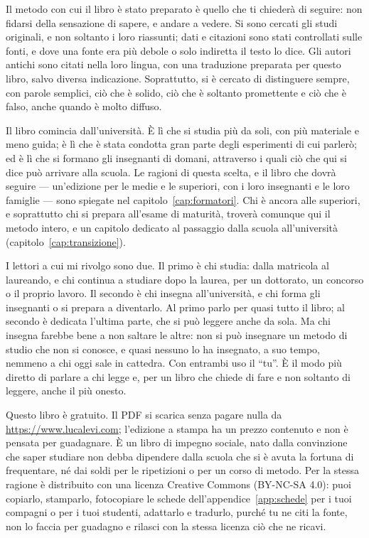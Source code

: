 Il metodo con cui il libro è stato preparato è quello che ti chiederà
di seguire: non fidarsi della sensazione di sapere, e andare a vedere.
Si sono cercati gli studi originali, e non soltanto i loro riassunti;
dati e citazioni sono stati controllati sulle fonti, e dove una fonte
era più debole o solo indiretta il testo lo dice. Gli autori antichi
sono citati nella loro lingua, con una traduzione preparata per questo
libro, salvo diversa indicazione. Soprattutto, si è cercato di
distinguere sempre, con parole semplici, ciò che è solido, ciò che è
soltanto promettente e ciò che è falso, anche quando è molto diffuso.

Il libro comincia dall'università. È lì che si studia più da soli, con
più materiale e meno guida; è lì che è stata condotta gran parte degli
esperimenti di cui parlerò; ed è lì che si formano gli insegnanti di
domani, attraverso i quali ciò che qui si dice può arrivare alla
scuola. Le ragioni di questa scelta, e il libro che dovrà seguire ---
un'edizione per le medie e le superiori, con i loro insegnanti e le
loro famiglie --- sono spiegate nel capitolo~\ref{cap:formatori}. Chi
è ancora alle superiori, e soprattutto chi si prepara all'esame di
maturità, troverà comunque qui il metodo intero, e un capitolo dedicato
al passaggio dalla scuola all'università
(capitolo~\ref{cap:transizione}).

I lettori a cui mi rivolgo sono due. Il primo è chi studia: dalla
matricola al laureando, e chi continua a studiare dopo la laurea, per
un dottorato, un concorso o il proprio lavoro. Il secondo è chi
insegna all'università, e chi forma gli insegnanti o si prepara a
diventarlo. Al primo parlo per quasi tutto il libro; al secondo è
dedicata l'ultima parte, che si può leggere anche da sola. Ma chi
insegna farebbe bene a non saltare le altre: non si può insegnare un
metodo di studio che non si conosce, e quasi nessuno lo ha insegnato,
a suo tempo, nemmeno a chi oggi sale in cattedra. Con entrambi uso il
\enquote{tu}. È il modo più diretto di parlare a chi legge e, per un
libro che chiede di fare e non soltanto di leggere, anche il più
onesto.

Questo libro è gratuito. Il PDF si scarica senza pagare nulla da
\url{https://www.lucalevi.com}; l'edizione a stampa ha un prezzo
contenuto e non è pensata per guadagnare. È un libro di impegno
sociale, nato dalla convinzione che saper studiare non debba dipendere
dalla scuola che si è avuta la fortuna di frequentare, né dai soldi per
le ripetizioni o per un corso di metodo. Per la stessa ragione è
distribuito con una licenza Creative Commons (BY-NC-SA 4.0): puoi
copiarlo, stamparlo, fotocopiare le schede dell'appendice~\ref{app:schede}
per i tuoi compagni o per i tuoi studenti, adattarlo e tradurlo,
purché tu ne citi la fonte, non lo faccia per guadagno e rilasci con la
stessa licenza ciò che ne ricavi.

